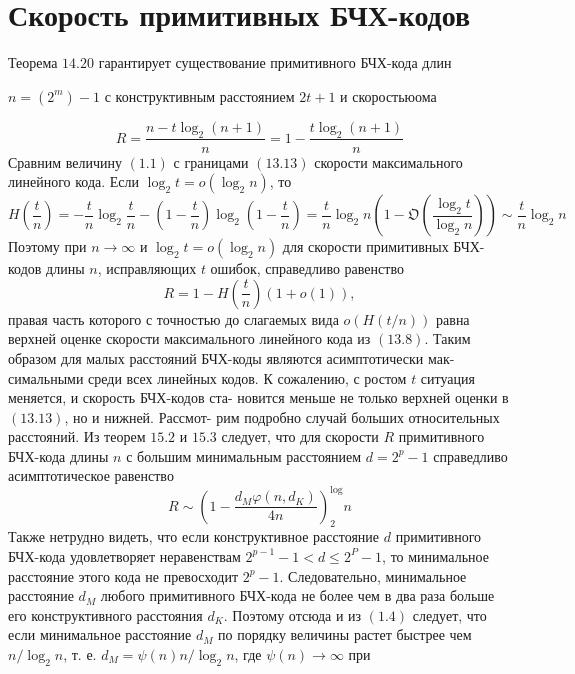 \documentclass{article}
\numberwithin{equation}{section} %
\begin{document}
    \tableofcontents %
    \newpage
    \section{Скорость примитивных БЧХ-кодов}
      Теорема $14.20$ гарантирует существование примитивного БЧХ-кода
      длин

     $n=(2^m)-1$ с конструктивным расстоянием $2t + 1$ и скоростьюома

    \begin{equation}
    R=\frac{n-t\log_2 (n+1)}{n}=1-\frac{t\log_2 (n+1)}{n}
  \label{eq.simple}
    \end{equation}
   Сравним величину $(1.1)$ с границами $(13.13)$ скорости максимального линейного кода. Если $\log_2 t = o(\log_2 n)$, то
    \begin{equation}
    H\left (\frac{t}{n}\right)=-\frac{t}{n}\log_2 \frac{t}{n}-\left(1-\frac{t}{n}\right)\log_2\left(1-\frac{t}{n}\right)=\frac{t}{n}\log_2 n\left(1-\mathfrak{O}\left(\frac{\log_2 t}{\log_2 n}\right)\right) \sim \frac{t}{n}\log_2 n

    \label{eq.second}
    \end{equation}
Поэтому при $n\rightarrow\infty$ и $\log_2 t = o(\log_2 n)$ для скорости примитивных БЧХ-кодов длины $n$, исправляющих $t$ ошибок, справедливо равенство
    \begin{equation}
    R=1-H\left(\frac{t}{n}\right)(1+o(1)),
        \label{eq.3d}
    \end{equation}
    правая часть которого с точностью до слагаемых вида $o(H(t/n))$ равна
верхней оценке скорости максимального линейного кода из $(13.8)$. Таким
образом для малых расстояний БЧХ-коды являются асимптотически мак-
симальными среди всех линейных кодов.
К сожалению, с ростом $t$ ситуация меняется, и скорость БЧХ-кодов ста-
новится меньше не только верхней оценки в $(13.13)$, но и нижней. Рассмот-
рим подробно случай больших относительных расстояний. Из теорем $15.2$ и
$15.3$ следует, что для скорости $R$ примитивного БЧХ-кода длины $n$ с большим минимальным расстоянием $d = 2^p-1$ справедливо асимптотическое равенство
\begin{equation}
    R\sim \left(1-\frac{d_M\varphi(n,d_K)}{4n}\right)^\log_2 n

            \label{equation}
   \end{equation}
   Также нетрудно видеть, что если конструктивное расстояние $d$ примитивного БЧХ-кода удовлетворяет неравенствам $2^{p-1}-1<d\le2^P-1$, то минимальное расстояние этого кода не превосходит $2^p-1$. Следовательно, минимальное расстояние $d_M$ любого примитивного БЧХ-кода не более чем в два раза больше его конструктивного расстояния $d_K$. Поэтому отсюда и из $(1.4)$ следует, что если минимальное расстояние $d_M$ по порядку величины растет быстрее чем $n/\log_2 n$, т. е. $d_M=\psi(n)n/ \log_2 n$, где $\psi(n)\rightarrow\infty$ при
\end{document}
